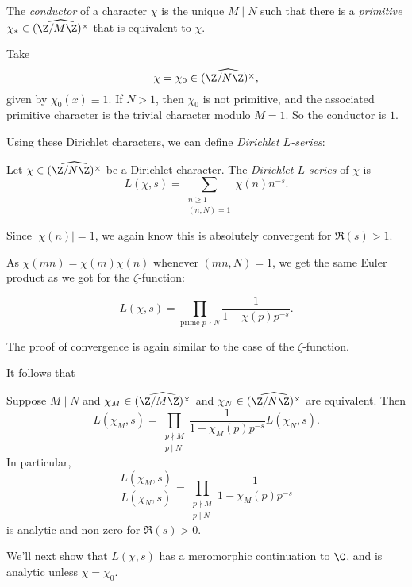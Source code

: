 \documentclass[a4paper]{article}
\begin{document}
\begin{defi}[Conductor]
  The \emph{conductor} of a character $\chi$ is the unique $M \mid N$ such that there is a \emph{primitive} $\chi_* \in \widehat{(\Z/M\Z)^\times}$ that is equivalent to $\chi$.
\end{defi}

\begin{eg}
  Take
  \[
    \chi = \chi_0 \in \widehat{(\Z/N\Z)^\times},
  \]
  given by $\chi_0(x) \equiv 1$. If $N > 1$, then $\chi_0$ is not primitive, and the associated primitive character is the trivial character modulo $M = 1$. So the conductor is $1$.
\end{eg}

Using these Dirichlet characters, we can define \emph{Dirichlet $L$-series}:

\begin{defi}
  Let $\chi \in \widehat{(\Z/N\Z)^\times}$ be a Dirichlet character. The \emph{Dirichlet $L$-series} of $\chi$ is
  \[
    L(\chi, s) = \sum_{\substack{n \geq 1\\(n, N) = 1}} \chi(n) n^{-s}.
  \]
\end{defi}
Since $|\chi(n)| = 1$, we again know this is absolutely convergent for $\Re(s) > 1$.

As $\chi(mn) = \chi(m)\chi(n)$ whenever $(mn, N) = 1$, we get the same Euler product as we got for the $\zeta$-function:
\begin{prop}
  \[
    L(\chi, s) = \prod_{\text{prime }p \nmid N} \frac{1}{1 - \chi(p) p^{-s}}.
  \]
\end{prop}
The proof of convergence is again similar to the case of the $\zeta$-function.

It follows that
\begin{prop}
  Suppose $M \mid N$ and $\chi_M \in \widehat{(\Z/M\Z)^\times}$ and $\chi_N \in \widehat{(\Z/N\Z)^\times}$ are equivalent. Then
  \[
    L(\chi_M, s) = \prod_{\substack{p \nmid M\\ p \mid N}} \frac{1}{1 - \chi_M(p) p^{-s}} L(\chi_N, s).
  \]
  In particular,
  \[
    \frac{L(\chi_M, s)}{ L(\chi_N, s)} = \prod_{\substack{p \nmid M\\ p \mid N}} \frac{1}{1 - \chi_M(p) p^{-s}}
  \]
  is analytic and non-zero for $\Re(s) > 0$.
\end{prop}

We'll next show that $L(\chi, s)$ has a meromorphic continuation to $\C$, and is analytic unless $\chi = \chi_0$.
\end{document}
